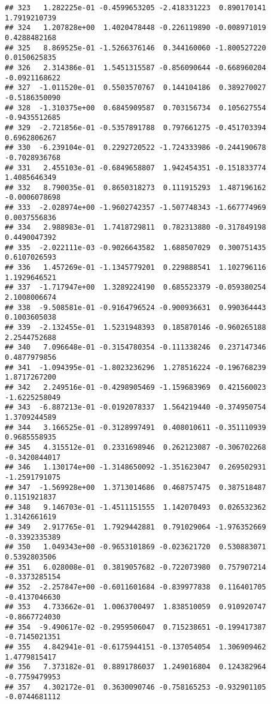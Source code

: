 \documentclass[
]{article}
\begin{document}
\begin{verbatim}
## 323   1.282225e-01 -0.4599653205 -2.418331223  0.890170141  1.7919210739
## 324   1.207828e+00  1.4020478448 -0.226119890 -0.008971019  0.4288482168
## 325   8.869525e-01 -1.5266376146  0.344160060 -1.800527220  0.0150625835
## 326   2.314386e-01  1.5451315587 -0.856090644 -0.668960204 -0.0921168622
## 327  -1.011520e-01  0.5503570767  0.144104186  0.389270027 -0.5186350090
## 328  -1.310375e+00  0.6845909587  0.703156734  0.105627554 -0.9435512685
## 329  -2.721856e-01 -0.5357891788  0.797661275 -0.451703394  0.6962806267
## 330  -6.239104e-01  0.2292720522 -1.724333986 -0.244190678 -0.7028936768
## 331   2.455103e-01 -0.6849658807  1.942454351 -0.151833774  1.4085646349
## 332   8.790035e-01  0.8650318273  0.111915293  1.487196162 -0.0006078698
## 333  -2.028974e+00 -1.9602742357 -1.507748343 -1.667774969  0.0037556836
## 334   2.988983e-01  1.7418729811  0.782313880 -0.317849198  0.4490047392
## 335  -2.022111e-03 -0.9026643582  1.688507029  0.300751435  0.6107026593
## 336   1.457269e-01 -1.1345779201  0.229888541  1.102796116  1.1929646521
## 337  -1.717947e+00  1.3289224190  0.685523379 -0.059380254  2.1008006674
## 338  -9.508581e-01 -0.9164796524 -0.900936631  0.990364443  0.1003605038
## 339  -2.132455e-01  1.5231948393  0.185870146 -0.960265188  2.2544752688
## 340   7.096648e-01 -0.3154780354 -0.111338246  0.237147346  0.4877979856
## 341  -1.094395e-01 -1.8023236296  1.278516224 -0.196768239  1.8717267200
## 342   2.249516e-01 -0.4298905469 -1.159683969  0.421560023 -1.6225258049
## 343  -6.887213e-01 -0.0192078337  1.564219440 -0.374950754  1.3709244589
## 344   3.166525e-01 -0.3128997491  0.408010611 -0.351110939  0.9685558935
## 345   4.315512e-01  0.2331698946  0.262123087 -0.306702268 -0.3420844017
## 346   1.130174e+00 -1.3148650092 -1.351623047  0.269502931 -1.2591791075
## 347  -1.569928e+00  1.3713014686  0.468757475  0.387518487  0.1151921837
## 348   9.146703e-01 -1.4511151555  1.142070493  0.026532362  1.3142661619
## 349   2.917765e-01  1.7929442881  0.791029064 -1.976352669 -0.3392335389
## 350   1.049343e+00 -0.9653101869 -0.023621720  0.530883071  0.5392803506
## 351   6.028008e-01  0.3819057682 -0.722073980  0.757907214 -0.3373285154
## 352  -2.257847e+00 -0.6011601684 -0.839977838  0.116401705 -0.4137046630
## 353   4.733662e-01  1.0063700497  1.838510059  0.910920747 -0.8667724030
## 354  -9.490617e-02 -0.2959506047  0.715238651 -0.199417387 -0.7145021351
## 355   4.842941e-01 -0.6175944151 -0.137054054  1.306909462  1.4779815417
## 356   7.373182e-01  0.8891786037  1.249016804  0.124382964 -0.7759479953
## 357   4.302172e-01  0.3630090746 -0.758165253 -0.932901105 -0.0744681112

\end{verbatim}
\end{document}

